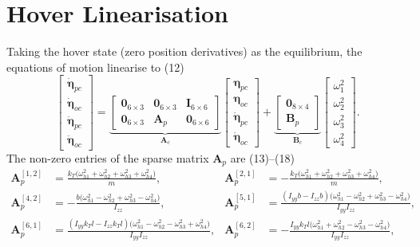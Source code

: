 \documentclass[12pt,a4paper]{report}
\begin{document}
\section{Hover Linearisation}
Taking the hover state (zero position derivatives) as the equilibrium, the equations of motion linearise to (12)
\begin{equation}\label{eq:lin}
\begin{bmatrix}\dot{\bm{\eta}}_{pc}\\[2pt]\dot{\bm{\eta}}_{oc}\\[2pt]\ddot{\bm{\eta}}_{pc}\\[2pt]\ddot{\bm{\eta}}_{oc}\end{bmatrix}
=\underbrace{\begin{bmatrix}\bm{0}_{6\times3} & \bm{0}_{6\times3} & \bm{I}_{6\times6}\\ \bm{0}_{6\times3} & \bm{A}_p & \bm{0}_{6\times6}\end{bmatrix}}_{\bm{A}_c}
\begin{bmatrix}\bm{\eta}_{pc}\\\bm{\eta}_{oc}\\\dot{\bm{\eta}}_{pc}\\\dot{\bm{\eta}}_{oc}\end{bmatrix}
+\underbrace{\begin{bmatrix}\bm{0}_{8\times4}\\ \bm{B}_p\end{bmatrix}}_{\bm{B}_c}
\begin{bmatrix}\omega_1^2\\\omega_2^2\\\omega_3^2\\\omega_4^2\end{bmatrix}.
\end{equation}
The non-zero entries of the sparse matrix $\bm{A}_p$ are (13)--(18)
\begin{align}
\bm{A}_p^{[1,2]} &= \frac{k_T\big(\omega_{h1}^2+\omega_{h2}^2+\omega_{h3}^2+\omega_{h4}^2\big)}{m}, &
\bm{A}_p^{[2,1]} &= -\frac{k_T\big(\omega_{h1}^2+\omega_{h2}^2+\omega_{h3}^2+\omega_{h4}^2\big)}{m},\\
\bm{A}_p^{[4,2]} &= -\frac{b\big(\omega_{h1}^2-\omega_{h2}^2+\omega_{h3}^2-\omega_{h4}^2\big)}{I_{zz}}, &
\bm{A}_p^{[5,1]} &= \frac{(I_{yy}b-I_{zz}b)\big(\omega_{h1}^2-\omega_{h2}^2+\omega_{h3}^2-\omega_{h4}^2\big)}{I_{yy}I_{zz}},\\
\bm{A}_p^{[6,1]} &= \frac{(I_{yy}k_Tl-I_{zz}k_Tl)\big(\omega_{h1}^2-\omega_{h2}^2-\omega_{h3}^2+\omega_{h4}^2\big)}{I_{yy}I_{zz}}, &
\bm{A}_p^{[6,2]} &= -\frac{I_{yy}k_Tl\big(\omega_{h1}^2+\omega_{h2}^2-\omega_{h3}^2-\omega_{h4}^2\big)}{I_{yy}I_{zz}},
\end{align}
\end{document}
